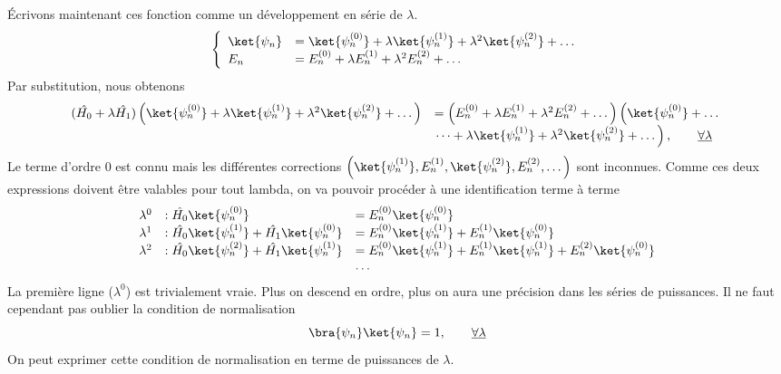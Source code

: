 	Écrivons maintenant ces fonction comme un développement en série de $\lambda$.
	\begin{equation}
	\left\{\begin{array}{ll}
	\ket{\psi_n} &= \ket{\psi_n^{(0)}}+\lambda\ket{\psi_n^{(1)}}+\lambda^2\ket{
	\psi_n^{(2)}}+\dots\\
	E_n &= E_n^{(0)}+\lambda E_n^{(1)}+\lambda^2E_n^{(2)}+\dots
	\end{array}\right.
	\end{equation}
	Par substitution, nous obtenons
	\begin{equation}
	\begin{array}{ll}
	(\hat{H_0}+\lambda\hat{H_1})\left(\ket{\psi_n^{(0)}}+\lambda\ket{\psi_n^{(1)}}
	+\lambda^2\ket{\psi_n^{(2)}}+\dots\right) &= \left(E_n^{(0)}+\lambda E_n^{(1)}
	+\lambda^2E_n^{(2)}+\dots \right)
	\left(\ket{\psi_n^{(0)}}+\dots\right.\\
	&\left.\dots+\lambda\ket{\psi_n^{(1)}}+\lambda^2\ket{\psi_n^{(2)}}+\dots\right),
	\qquad 	\underline{\forall\lambda}
	\end{array}
	\end{equation}		
	Le terme d'ordre 0 est connu mais les différentes corrections	$\left(\ket{\psi_n^{(1)}}, 
	E_n^{(1)}, 	\ket{\psi_n^{(2)}}, E_n^{(2)},\dots\right)$ sont inconnues. Comme ces deux 
	expressions doivent être valables pour tout lambda, on va pouvoir procéder à une 
	identification terme à terme
	\begin{equation}
	\begin{array}{lll}
	\lambda^0 &: \hat{H_0}\ket{\psi_n^{(0)}} &= E_n^{(0)}\ket{\psi_n^{(0)}}\\
	\lambda^1 &: \hat{H_0}\ket{\psi_n^{(1)}}+\hat{H_1}\ket{\psi_n^{(0)}} &= E_n^{(0
	)}\ket{\psi_n^{(1)}}+E_n^{(1)}\ket{\psi_n^{(0)}}\\
	\lambda^2 &: \hat{H_0}\ket{\psi_n^{(2)}}+\hat{H_1}\ket{\psi_n^{(1)}} &= E_n^{(0
	)}\ket{\psi_n^{(1)}}+E_n^{(1)}\ket{\psi_n^{(1)}}+E_n^{(2)}\ket{\psi_n^{(0)}}\\		
	&&\dots
	\end{array}
	\label{eq:9.6}
	\end{equation}
	La première ligne ($\lambda^0$) est trivialement vraie. Plus on descend en ordre, 
	plus on aura une précision dans les séries	de puissances. Il ne faut cependant pas 
	oublier la condition de normalisation 
	\begin{equation}
	\bra{\psi_n}\ket{\psi_n} = 1,\qquad \underline{\forall\lambda}
	\end{equation}
	On peut exprimer cette condition de normalisation en terme de 	puissances de $\lambda$.
